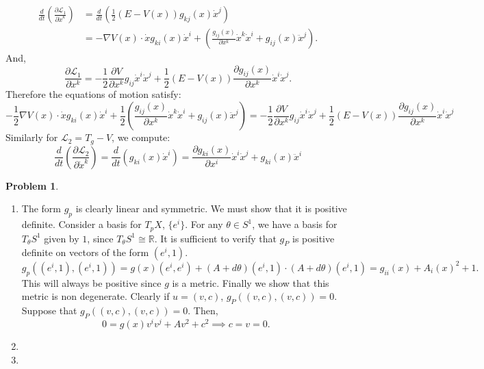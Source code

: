 \documentclass[12pt, a4paper]{article}
\newtheorem{problem}{Problem}
\theoremstyle{definition}
\newcommand{\penum}{ \begin{enumerate}[label=\bf(\alph*), leftmargin=0pt]}
\newcommand{\epenum}{ \end{enumerate} }
\newcommand{\R}{\mathbb{R}}                           %
\newcommand{\eL}{\mathcal{L}}                         %
\newcommand{\grad}{\nabla}
\begin{document}
\begin{align*}
\frac{d}{dt} \left(\frac{\partial \eL_1}{\partial \dot{x}^k}\right) &= \frac{d}{dt} \left(\frac{1}{2}(E-V(x))g_{kj}(x) \dot{x}^j \right)
\\ & = -\grad V(x) \cdot \dot{x} g_{ki}(x)\dot{x}^i  +  \left( \frac{g_{ij}(x)}{\partial x^k} \dot{x}^k \dot{x}^i + g_{ij}(x)\ddot{x}^j \right).
\end{align*}
And,
$$\frac{\partial \eL_1}{\partial x^k} =-\frac{1}{2} \frac{\partial V}{\partial x^k}  g_{ij}\dot{x}^i \dot{x}^j  + \frac{1}{2}(E - V(x)) \frac{\partial g_{ij}(x)}{\partial x^k} \dot{x}^i \dot{x}^j.$$
Therefore the equations of motion satisfy: 
$$-\frac{1}{2} \grad V(x) \cdot \dot{x} g_{ki}(x)\dot{x}^i  + \frac{1}{2} \left( \frac{g_{ij}(x)}{\partial x^k} \dot{x}^k \dot{x}^i + g_{ij}(x)\ddot{x}^j \right) =  -\frac{1}{2} \frac{\partial V}{\partial x^k}  g_{ij}\dot{x}^i \dot{x}^j  + \frac{1}{2}(E - V(x)) \frac{\partial g_{ij}(x)}{\partial x^k} \dot{x}^i \dot{x}^j$$
Similarly for $\eL_2 = T_g - V$, we compute:
	$$\frac{d}{dt} \left( \frac{\partial \eL_2}{\partial \dot{x}^k}\right)  = \frac{d}{dt} \left( g_{ki}(x) \dot{x}^i \right) 
 = \frac{ \partial g_{ki}(x)}{\partial x^i} \dot{x}^i \dot{x}^j + g_{ki}(x) \ddot{x}^i $$
\newpage
\begin{problem}
\end{problem}
\penum
\item The form $g_p$ is clearly linear and symmetric. We must show that it is positive definite. Consider a basis for $T_pX$, $\{e^i\}$. For any $\theta \in S^1$, we have a basis for $T_\theta S^1$ given by $1$, since $T_\theta S^1 \cong\R$. It is sufficient to verify that $g_P$ is positive definite
on vectors of the form $(e^i, 1)$.
$$g_p((e^i, 1),(e^i,1)) = g(x)(e^i, e^i) + (A + d\theta )(e^i,1) \cdot (A + d\theta)(e^i, 1) =g_{ii}(x) + A_i(x)^2  + 1. $$
This will always be positive since $g$ is a metric. Finally we show that this metric is non degenerate. Clearly if $u = (v,c)$, $g_P((v,c),(v,c)) = 0$. Suppose that $g_P((v,c),(v,c)) = 0$. Then, 
$$0 = g(x)v^{i}v^{j}  +  Av^2 + c^2 \implies c=v=0.$$
\item 
\item 
\epenum
\newpage
\end{document}

